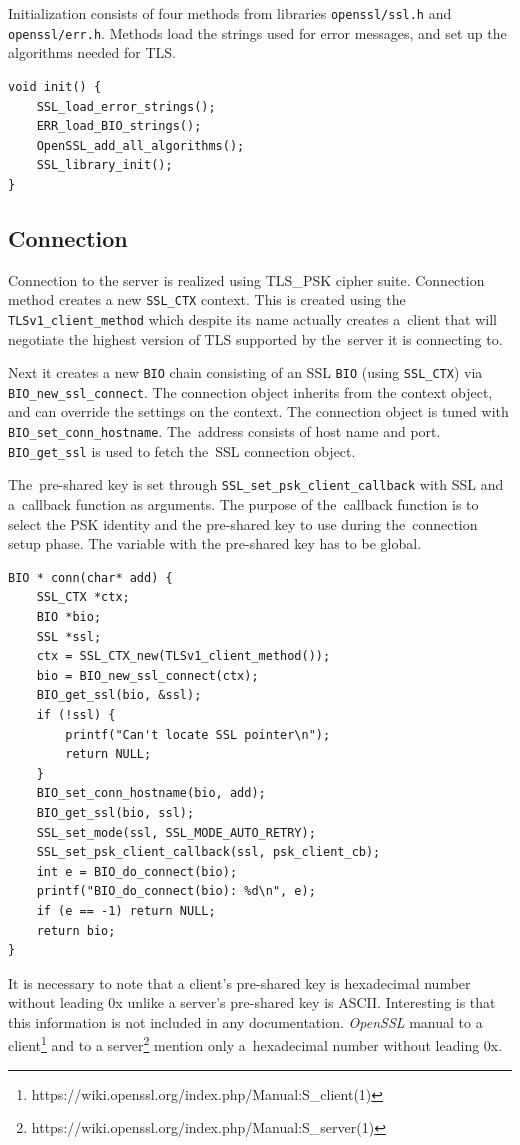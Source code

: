 \documentclass[
  12pt, 
  digital, %
  notable,   %
  nolof,     %
  nolot,     %
]{fithesis3}
\begin{document}
Initialization consists of four methods from libraries \texttt{openssl/ssl.h} and 
\texttt{openssl/err.h}. Methods load the strings used for error messages, and set up the 
algorithms needed for TLS. 
\begin{lstlisting}
void init() {
	SSL_load_error_strings();
	ERR_load_BIO_strings();
	OpenSSL_add_all_algorithms();
	SSL_library_init();
}
\end{lstlisting}

\subsection{Connection}\label{conn}

Connection to the server is realized using TLS\_PSK cipher suite. Connection method creates a new 
\texttt{SSL\_CTX} context. This is created using the \texttt{TLSv1\_client\_method} which despite 
its name actually creates a~client that will negotiate the highest version of TLS supported by 
the~server it is connecting to. 

Next it creates a new \texttt{BIO} chain consisting of an SSL \texttt{BIO} (using 
\texttt{SSL\_CTX}) via \texttt{BIO\_new\_ssl\_connect}. The connection object inherits from the 
context object, and can override the settings on the context. The connection object is tuned with 
\texttt{BIO\_set\_conn\_hostname}. The~address consists of host name and port. 
\texttt{BIO\_get\_ssl} is used to fetch the~SSL connection object. 

The~pre-shared key is set through \texttt{SSL\_set\_psk\_client\_callback} with SSL and a~callback 
function as arguments. The purpose of the~callback function is to select the PSK identity and the 
pre-shared key to use during the~connection setup phase. The variable with the pre-shared key has 
to be global. 

\begin{lstlisting}
BIO * conn(char* add) {
	SSL_CTX *ctx;
	BIO *bio;
	SSL *ssl;
	ctx = SSL_CTX_new(TLSv1_client_method());
	bio = BIO_new_ssl_connect(ctx);
	BIO_get_ssl(bio, &ssl);
	if (!ssl) {
		printf("Can't locate SSL pointer\n");
		return NULL;
	}
	BIO_set_conn_hostname(bio, add);
	BIO_get_ssl(bio, ssl);
	SSL_set_mode(ssl, SSL_MODE_AUTO_RETRY);
	SSL_set_psk_client_callback(ssl, psk_client_cb);
	int e = BIO_do_connect(bio);
	printf("BIO_do_connect(bio): %d\n", e);
	if (e == -1) return NULL;
	return bio;
}
\end{lstlisting}

It is necessary to note that a client's pre-shared key is hexadecimal number without leading 0x unlike a server's pre-shared key is ASCII. Interesting is that this information is not included in any documentation. \textit{OpenSSL} manual to a client\footnote{https://wiki.openssl.org/index.php/Manual:S\_client(1)} and to a server\footnote{https://wiki.openssl.org/index.php/Manual:S\_server(1)} mention only a~hexadecimal number without leading 0x.
\end{document}
